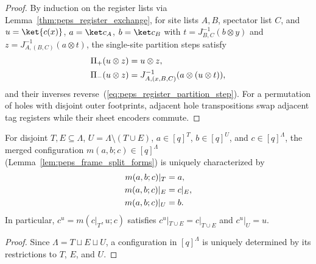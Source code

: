 \begin{proof}\leanok
    By induction on the register lists via Lemma~\ref{thm:peps_register_exchange},
    for site lists $A,B$, spectator list $C$, and $u=\ket{c(x)}$, $a=\ket c_A$,
    $b=\ket c_B$ with $t=J_{B,C}^{-1}(b\otimes y)$ and
    $z=J_{A,(B,C)}^{-1}(a\otimes t)$, the single-site partition steps satisfy
    \begin{align}
        \Pi_+(u\otimes z) & =u\otimes z,\notag                         \\
        \Pi_-(u\otimes z) & =J_{A,(x,B,C)}^{-1}(a\otimes(u\otimes t)),
        \label{eq:peps_register_partition_step}
    \end{align}
    and their inverses reverse~(\ref{eq:peps_register_partition_step}). For a
    permutation of holes with disjoint outer footprints, adjacent hole
    transpositions swap adjacent tag registers while their sheet encoders
    commute.
\end{proof}

\begin{lemma}
    \label{thm:peps_region_configuration}
    \leanok
    For disjoint $T,E\subseteq\Lambda$, $U=\Lambda\setminus(T\cup E)$,
    $a\in[q]^T$, $b\in[q]^U$, and $c\in[q]^\Lambda$, the merged configuration
    $m(a,b;c)\in[q]^\Lambda$ (Lemma~\ref{lem:peps_frame_split_forms}) is
    uniquely characterized by
    \begin{align}
        m(a,b;c)|_T & =a,\notag    \\
        m(a,b;c)|_E & =c|_E,\notag \\
        m(a,b;c)|_U & =b.
        \label{eq:peps_region_reconstruction}
    \end{align}
    In particular, $c^u=m(c|_T,u;c)$ satisfies $c^u|_{T\cup E}=c|_{T\cup E}$
    and $c^u|_U=u$.
\end{lemma}

\begin{proof}\leanok
    Since $\Lambda=T\sqcup E\sqcup U$, a configuration in $[q]^\Lambda$ is
    uniquely determined by its restrictions to $T$, $E$, and $U$.
\end{proof}

